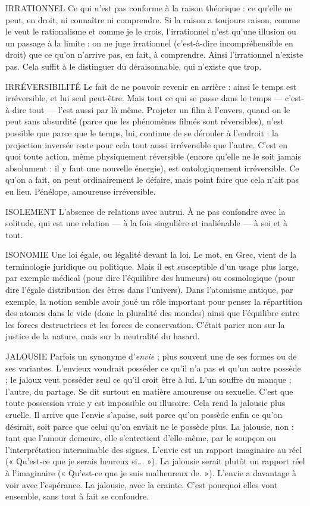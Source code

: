 {IRRATIONNEL Ce qui n’est pas conforme à la raison théorique : ce qu’elle
ne peut, en droit, ni connaître ni comprendre. Si la raison
a toujours raison, comme le veut le rationalisme et comme je le crois, l’irrationnel
n’est qu’une illusion ou un passage à la limite : on ne juge irrationnel
(c’est-à-dire incompréhensible en droit) que ce qu’on n'arrive pas, en fait, à
comprendre. Ainsi l’irrationnel n’existe pas. Cela suffit à le distinguer du déraisonnable,
qui n’existe que trop.

IRRÉVERSIBILITÉ Le fait de ne pouvoir revenir en arrière : ainsi le temps
est irréversible, et lui seul peut-être. Mais tout ce qui se
passe dans le temps — c’est-à-dire tout — l’est aussi par là même. Projeter un film
à l’envers, quand on le peut sans absurdité (parce que les phénomènes filmés
sont réversibles), n’est possible que parce que le temps, lui, continue de se
dérouler à l'endroit : la projection inversée reste pour cela tout aussi irréversible
que l’autre. C’est en quoi toute action, même physiquement réversible (encore
qu'elle ne le soit jamais absolument : il y faut une nouvelle énergie), est ontologiquement
irréversible. Ce qu’on a fait, on peut ordinairement le défaire,
mais point faire que cela n’ait pas eu lieu. Pénélope, amoureuse irréversible.

ISOLEMENT L'absence de relations avec autrui. À ne pas confondre avec la
solitude, qui est une relation — à la fois singulière et inaliénable
— à soi et à tout.

ISONOMIE Une loi égale, ou légalité devant la loi. Le mot, en Grec, vient
de la terminologie juridique ou politique. Mais il est susceptible
d’un usage plus large, par exemple médical (pour dire l’équilibre des
humeurs) ou cosmologique (pour dire l’égale distribution des êtres dans l’univers).
Dans l’atomisme antique, par exemple, la notion semble avoir joué un
rôle important pour penser la répartition des atomes dans le vide (donc la pluralité
des mondes) ainsi que l’équilibre entre les forces destructrices et les forces
de conservation. C'était parier non sur la justice de la nature, mais sur la neutralité
du hasard.

JALOUSIE Parfois un synonyme d’{\it envie} ; plus souvent une de ses formes ou
de ses variantes. L’envieux voudrait posséder ce qu’il n’a pas et
qu'un autre possède ; le jaloux veut posséder seul ce qu’il croit être à lui. L'un
souffre du manque ; l’autre, du partage. Se dit surtout en matière amoureuse
ou sexuelle. C’est que toute possession vraie y est impossible ou illusoire.
Cela rend la jalousie plus cruelle. Il arrive que l'envie s’apaise, soit parce
qu'on possède enfin ce qu’on désirait, soit parce que celui qu’on enviait ne le
possède plus. La jalousie, non : tant que l’amour demeure, elle s’entretient
d'elle-même, par le soupçon ou l’interprétation interminable des signes.
L'envie est un rapport imaginaire au réel (« Qu'est-ce que je serais heureux
si... »). La jalousie serait plutôt un rapport réel à l'imaginaire (« Qu’est-ce
que je suis malheureux de. »). L’envie a davantage à voir avec l'espérance.
La jalousie, avec la crainte. C’est pourquoi elles vont ensemble, sans tout à
fait se confondre.

}
